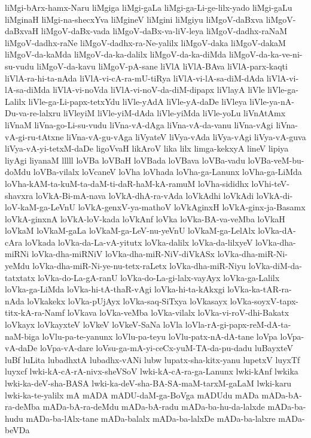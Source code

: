 {liMgi-bArx-hamx-Naru
liMgiga
liMgi-gaLa
liMgi-ga-Li-ge-lilx-yado
liMgi-gaLu
liMginaH
liMgi-na-shecxYva
liMgineV
liMgini
liMgiyu
liMgoV-daBxva
liMgoV-daBxvaH
liMgoV-daBx-vada
liMgoV-daBx-va-liV-leya
liMgoV-dadhx-raNaM
liMgoV-dadhx-raNe
liMgoV-dadhx-ra-Ne-yalilx
liMgoV-daka
liMgoV-dakaM
liMgoV-da-kaMda
liMgoV-da-ka-dalilx
liMgoV-da-ka-diMda
liMgoV-da-ka-ve-ni-su-vudu
liMgoV-da-kavu
liMgoV-pA-sane
liVlA
liVlA-BAva
liVlA-parx-kaqti
liVlA-ra-hi-ta-nAda
liVlA-vi-cA-ra-mU-tiRya
liVlA-vi-lA-sa-diM-dAda
liVlA-vi-lA-sa-diMda
liVlA-vi-noVda
liVlA-vi-noV-da-diM-dipapx
liVlayA
liVle
liVle-ga-Lalilx
liVle-ga-Li-papx-tetxYdu
liVle-yAdA
liVle-yA-daDe
liVleya
liVle-ya-nA-Du-va-re-lalxru
liVleyiM
liVle-yiM-dAda
liVle-yiMda
liVle-yoLu
liVnAtAmx
liVnaM
liVna-go-Li-su-vudu
liVna-vA-dAga
liVna-vA-da-vanu
liVna-vAgi
liVna-vA-gi-ru-tAtxne
liVna-vA-gu-vAga
liVyateV
liVya-vAda
liVya-vAgi
liVya-vA-guva
liVya-vA-yi-tetxM-daDe
ligoVvaH
likAroV
lika
lilx
limga-kekxyA
lineV
lipiya
liyAgi
liyanaM
lllll
loVBa
loVBaH
loVBada
loVBava
loVBa-vadu
loVBa-veM-bu-doMdu
loVBa-vilalx
loVcaneV
loVha
loVhada
loVha-ga-Lanunx
loVha-ga-LiMda
loVha-kAM-ta-kuM-ta-daM-ti-daR-haM-kA-ramuM
loVha-sididhx
loVhi-teV-shavxra
loVkA-Bi-mA-nava
loVkA-dhA-ra-vAda
loVkAdhi
loVkAdi
loVkA-di-loV-kaM-ga-LeVnU
loVkA-genxV-ya-mathoV
loVkAginxH
loVkA-ginx-ja-Basamx
loVkA-ginxnA
loVkA-loV-kada
loVkAnf
loVka
loVka-BA-va-veMba
loVkaH
loVkaM
loVkaM-gaLa
loVkaM-ga-LeV-nu-yeVnU
loVkaM-ga-LelAlx
loVka-dA-cAra
loVkada
loVka-da-La-vA-yitutx
loVka-dalilx
loVka-da-lilxyeV
loVka-dha-miRNi
loVka-dha-miRNiV
loVka-dha-miR-NiV-diVkASx
loVka-dha-miR-Ni-yeMdu
loVka-dha-miR-Ni-ye-nu-tetx-raLetx
loVka-dha-miR-Niyu
loVka-diM-da-tatxtatx
loVka-do-La-gA-ranU
loVka-do-La-gi-lalx-vayAyx
loVka-ga-Lalilx
loVka-ga-LiMda
loVka-hi-tA-thaR-vAgi
loVka-hi-ta-kAkxgi
loVka-ka-tAR-ra-nAda
loVkakekx
loVka-pUjAyx
loVka-saq-SiTxya
loVkasayx
loVka-soyxV-tapx-titx-kA-ra-Namf
loVkava
loVka-veMba
loVka-vilalx
loVka-vi-roV-dhi-Bakatx
loVkayx
loVkayxteV
loVkeV
loVkeV-SaNa
loVla
loVla-rA-gi-papx-reM-dA-ta-naM-biga
loVlu-pa-te-yanunx
loVlu-pa-teyu
loVlu-patx-nA-dA-tane
loVpa
loVpa-vA-daDe
loVpa-vA-dare
loVsu-ga-mA-yi-ceCx-yuM-TA-da-pu-dadu
luBayxteV
luBf
luLita
lubadhxtA
lubadhx-vANi
lubw
lupatx-sha-kitx-yanu
lupetxV
luyxTf
luyxcf
lwki-kA-cA-rA-nivx-sheVSoV
lwki-kA-cA-ra-ga-Lanunx
lwki-kAnf
lwkika
lwki-ka-deV-sha-BASA
lwki-ka-deV-sha-BA-SA-maM-tarxM-gaLaM
lwki-karu
lwki-ka-te-yalilx
mA
mADA
mADU-daM-ga-BoVga
mADUdu
mADa
mADa-bA-ra-deMba
mADa-bA-ra-deMdu
mADa-bA-radu
mADa-ba-hu-da-lalxde
mADa-ba-hudu
mADa-ba-lAlx-tane
mADa-balalx
mADa-ba-lalxDe
mADa-ba-lalxre
mADa-beVDa
}
